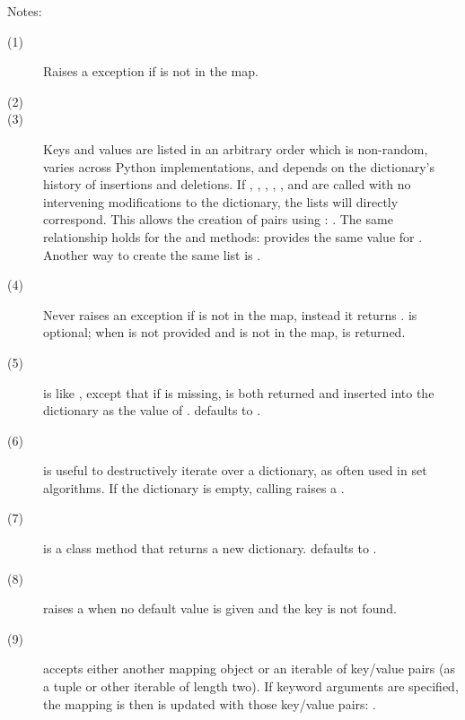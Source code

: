 \noindent
Notes:
\begin{description}
\item[(1)] Raises a  exception if  is not
in the map.

\item[(2)] 

\item[(3)] Keys and values are listed in an arbitrary order which is
non-random, varies across Python implementations, and depends on the
dictionary's history of insertions and deletions.
If , , ,
, , and 
are called with no intervening modifications to the dictionary, the
lists will directly correspond.  This allows the creation of
 pairs using :
.  The same
relationship holds for the  and
 methods:  provides the same value for .
Another way to create the same list is .

\item[(4)] Never raises an exception if  is not in the map,
instead it returns .   is optional; when  is not
provided and  is not in the map,  is returned.

\item[(5)]  is like , except
that if  is missing,  is both returned and inserted into
the dictionary as the value of .  defaults to .

\item[(6)]  is useful to destructively iterate
over a dictionary, as often used in set algorithms.  If the dictionary
is empty, calling  raises a .

\item[(7)]  is a class method that returns a
new dictionary.  defaults to .  

\item[(8)]  raises a  when no default
value is given and the key is not found.  

\item[(9)]  accepts either another mapping object
or an iterable of key/value pairs (as a tuple or other iterable of
length two).  If keyword arguments are specified, the mapping is
then is updated with those key/value pairs:
.


\end{description}
